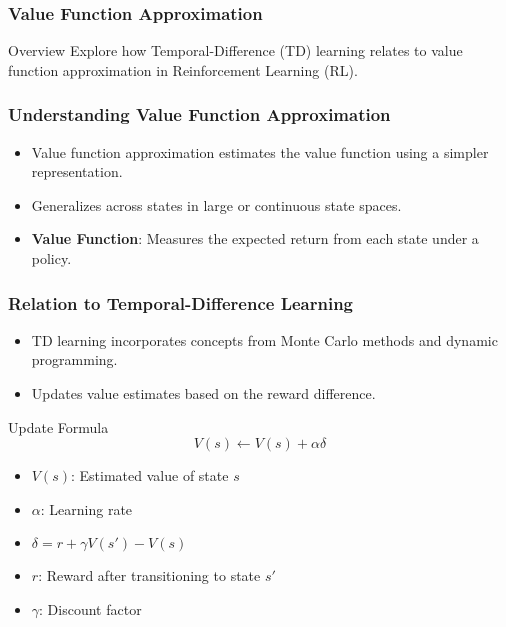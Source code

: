 \documentclass[aspectratio=169]{beamer}
\begin{document}
\begin{frame}[fragile]
    \frametitle{Value Function Approximation}
    \begin{block}{Overview}
        Explore how Temporal-Difference (TD) learning relates to value function approximation in Reinforcement Learning (RL).
    \end{block}
\end{frame}

\begin{frame}[fragile]
    \frametitle{Understanding Value Function Approximation}
    \begin{itemize}
        \item Value function approximation estimates the value function using a simpler representation.
        \item Generalizes across states in large or continuous state spaces.
        \item \textbf{Value Function}: Measures the expected return from each state under a policy.
    \end{itemize}
\end{frame}

\begin{frame}[fragile]
    \frametitle{Relation to Temporal-Difference Learning}
    \begin{itemize}
        \item TD learning incorporates concepts from Monte Carlo methods and dynamic programming.
        \item Updates value estimates based on the reward difference.
    \end{itemize}
    \begin{block}{Update Formula}
        \[
        V(s) \leftarrow V(s) + \alpha \delta
        \]
        \begin{itemize}
            \item \(V(s)\): Estimated value of state \(s\)
            \item \(\alpha\): Learning rate
            \item \(\delta = r + \gamma V(s') - V(s)\)
            \item \(r\): Reward after transitioning to state \(s'\)
            \item \(\gamma\): Discount factor
        \end{itemize}
    \end{block}
\end{frame}
\end{document}
